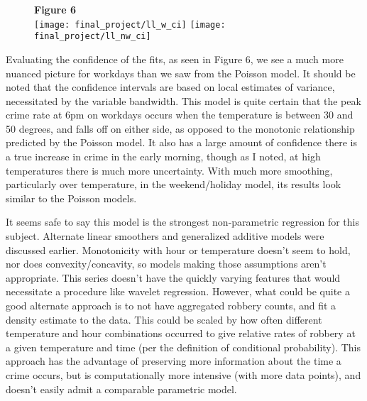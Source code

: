 \documentclass[11pt]{article}
\theoremstyle{definition}
\begin{document}
\begin{figure}[h]
    {\bf Figure 6} \\
    \texttt{[image: final\_project/ll\_w\_ci]}
    \texttt{[image: final\_project/ll\_nw\_ci]}
\end{figure}
Evaluating the confidence of the fits, as seen in Figure 6, we see a much more nuanced picture for workdays than we saw from the Poisson model. It should be noted that the confidence intervals are based on local estimates of variance, necessitated by the variable bandwidth. This model is quite certain that the peak crime rate at $6$pm on workdays occurs when the temperature is between 30 and 50 degrees, and falls off on either side, as opposed to the monotonic relationship predicted by the Poisson model. It also has a large amount of confidence there is a true increase in crime in the early morning, though as I noted, at high temperatures there is much more uncertainty. With much more smoothing, particularly over temperature, in the weekend/holiday model, its results look similar to the Poisson models. \par
It seems safe to say this model is the strongest non-parametric regression for this subject. Alternate linear smoothers and generalized additive models were discussed earlier. Monotonicity with hour or temperature doesn't seem to hold, nor does convexity/concavity, so models making those assumptions aren't appropriate. This series doesn't have the quickly varying features that would necessitate a procedure like wavelet regression. However, what could be quite a good alternate approach is to not have aggregated robbery counts, and fit a density estimate to the data. This could be scaled by how often different temperature and hour combinations occurred to give relative rates of robbery at a given temperature and time (per the definition of conditional probability). This approach has the advantage of preserving more information about the time a crime occurs, but is computationally more intensive (with more data points), and doesn't easily admit a comparable parametric model.
\end{document}
